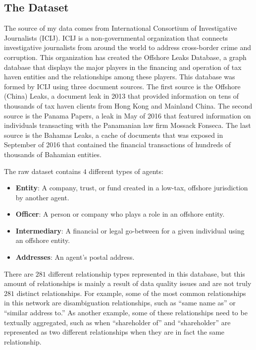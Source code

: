 \documentclass[11pt]{article}
\begin{document}
\subsection{The Dataset}

The source of my data comes from International Consortium of Investigative
Journalists (ICIJ). ICIJ is a non-governmental organization that
connects investigative
journalists from around the world to address cross-border crime and
corruption. This organization has created the Offshore
Leaks Database, a graph database that displays the major players in the
financing and operation of tax haven entities and the relationships among these
players. This database was formed by ICIJ using three document sources. The 
first source is the Offshore (China) Leaks, a document leak in 2013
that provided information on tens of thousands of tax haven clients from 
Hong Kong and Mainland China. The second source is the Panama Papers, a leak in 
May of 2016 that featured information on individuals transacting with the
Panamanian law firm Mossack Fonseca. The last source is the Bahamas Leaks, 
a cache of
documents that was exposed in September of 2016 that contained the financial
transactions of hundreds of thousands of Bahamian entities.

The raw dataset contains $4$ different types of agents:
\begin{itemize}
    \item \textbf{Entity}: A company, trust, or fund created in a low-tax, 
        offshore jurisdiction by another agent.
    \item \textbf{Officer}: A person or company who plays a role in an offshore 
        entity.
    \item \textbf{Intermediary}: A financial or legal go-between for a given
        individual using an offshore entity.
    \item \textbf{Addresses}: An agent's postal address.
\end{itemize}
There are $281$ different relationship types represented in this database, but
this amount of relationships is mainly a result of data quality issues and are
not truly $281$ distinct relationships. For example, some of the
most common relationships in this network are disambiguation relationships, such
as ``same name as'' or ``similar address to.'' As another example, some of these
relationships need to be textually aggregated, such as when ``shareholder of''
and ``shareholder'' are represented as two different relationships when they
are in fact the same relationship.
\end{document}

